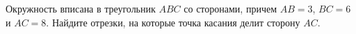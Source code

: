 \begin{ex}
	\begin{condition}
		Окружность вписана в треугольник \( ABC \) со сторонами,
		причем \( AB=3 \), \( BC=6 \) и \( AC=8 \). Найдите отрезки, на которые точка касания делит сторону \( AC \).
	\end{condition}
\end{ex}